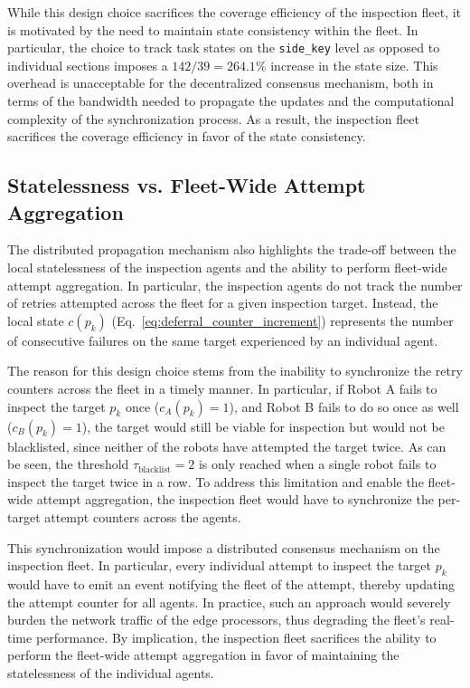 While this design choice sacrifices the coverage efficiency of the inspection fleet, it is motivated by the need to maintain state consistency within the fleet. In particular, the choice to track task states on the \texttt{side\_key} level as opposed to individual sections imposes a $142 / 39 = 264.1\%$ increase in the state size. This overhead is unacceptable for the decentralized consensus mechanism, both in terms of the bandwidth needed to propagate the updates and the computational complexity of the synchronization process. As a result, the inspection fleet sacrifices the coverage efficiency in favor of the state consistency.

\subsection{Statelessness vs. Fleet-Wide Attempt Aggregation}

The distributed propagation mechanism also highlights the trade-off between the local statelessness of the inspection agents and the ability to perform fleet-wide attempt aggregation. In particular, the inspection agents do not track the number of retries attempted across the fleet for a given inspection target. Instead, the local state $c(p_k)$ (Eq.~\ref{eq:deferral_counter_increment}) represents the number of consecutive failures on the same target experienced by an individual agent.

The reason for this design choice stems from the inability to synchronize the retry counters across the fleet in a timely manner. In particular, if Robot A fails to inspect the target $p_k$ once ($c_A(p_k) = 1$), and Robot B fails to do so once as well ($c_B(p_k) = 1$), the target would still be viable for inspection but would not be blacklisted, since neither of the robots have attempted the target twice. As can be seen, the threshold $\tau_{\text{blacklist}} = 2$ is only reached when a single robot fails to inspect the target twice in a row. To address this limitation and enable the fleet-wide attempt aggregation, the inspection fleet would have to synchronize the per-target attempt counters across the agents.

This synchronization would impose a distributed consensus mechanism on the inspection fleet. In particular, every individual attempt to inspect the target $p_k$ would have to emit an event notifying the fleet of the attempt, thereby updating the attempt counter for all agents. In practice, such an approach would severely burden the network traffic of the edge processors, thus degrading the fleet's real-time performance. By implication, the inspection fleet sacrifices the ability to perform the fleet-wide attempt aggregation in favor of maintaining the statelessness of the individual agents.

